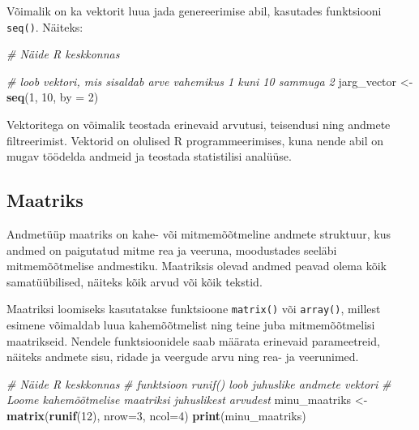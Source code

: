 \documentclass[
]{book}
\newenvironment{Shaded}{\begin{snugshade}}{\end{snugshade}}
\newcommand{\AttributeTok}[1]{\textcolor[rgb]{0.13,0.29,0.53}{#1}}
\newcommand{\CommentTok}[1]{\textcolor[rgb]{0.56,0.35,0.01}{\textit{#1}}}
\newcommand{\DecValTok}[1]{\textcolor[rgb]{0.00,0.00,0.81}{#1}}
\newcommand{\FunctionTok}[1]{\textcolor[rgb]{0.13,0.29,0.53}{\textbf{#1}}}
\newcommand{\NormalTok}[1]{#1}
\newcommand{\OtherTok}[1]{\textcolor[rgb]{0.56,0.35,0.01}{#1}}
\renewenvironment{Shaded} {\begin{snugshade}\footnotesize} {\end{snugshade}}
\begin{document}
Võimalik on ka vektorit luua jada genereerimise abil, kasutades funktsiooni \texttt{seq()}. Näiteks:

\begin{Shaded}
\begin{Highlighting}[]
\CommentTok{\# Näide R keskkonnas}

\CommentTok{\# loob vektori, mis sisaldab arve vahemikus 1 kuni 10 sammuga 2}
\NormalTok{jarg\_vector }\OtherTok{\textless{}{-}} \FunctionTok{seq}\NormalTok{(}\DecValTok{1}\NormalTok{, }\DecValTok{10}\NormalTok{, }\AttributeTok{by =} \DecValTok{2}\NormalTok{) }
\end{Highlighting}
\end{Shaded}

Vektoritega on võimalik teostada erinevaid arvutusi, teisendusi ning andmete filtreerimist. Vektorid on olulised R programmeerimises, kuna nende abil on mugav töödelda andmeid ja teostada statistilisi analüüse.

\subsection{Maatriks}\label{maatriks}

Andmetüüp maatriks on kahe- või mitmemõõtmeline andmete struktuur, kus andmed on paigutatud mitme rea ja veeruna, moodustades seeläbi mitmemõõtmelise andmestiku. Maatriksis olevad andmed peavad olema kõik samatüübilised, näiteks kõik arvud või kõik tekstid.

Maatriksi loomiseks kasutatakse funktsioone \texttt{matrix()} või \texttt{array()}, millest esimene võimaldab luua kahemõõtmelist ning teine juba mitmemõõtmelisi maatrikseid. Nendele funktsioonidele saab määrata erinevaid parameetreid, näiteks andmete sisu, ridade ja veergude arvu ning rea- ja veerunimed.

\begin{Shaded}
\begin{Highlighting}[]
\CommentTok{\# Näide R keskkonnas}
\CommentTok{\# funktsioon runif() loob juhuslike andmete vektori}
\CommentTok{\# Loome kahemõõtmelise maatriksi juhuslikest arvudest}
\NormalTok{minu\_maatriks }\OtherTok{\textless{}{-}} \FunctionTok{matrix}\NormalTok{(}\FunctionTok{runif}\NormalTok{(}\DecValTok{12}\NormalTok{), }\AttributeTok{nrow=}\DecValTok{3}\NormalTok{, }\AttributeTok{ncol=}\DecValTok{4}\NormalTok{)}
\FunctionTok{print}\NormalTok{(minu\_maatriks)}
\end{Highlighting}
\end{Shaded}
\end{document}
